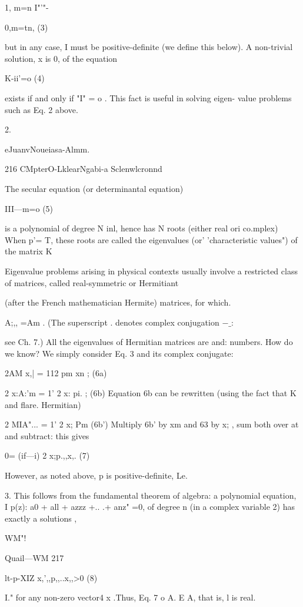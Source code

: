 1, m=n
I"'"-{0,m=tn, (3)

but in any case, I must be positive-deﬁnite (we deﬁne this
below). A non-trivial solution, x is 0, of the equation

K-ii'=o (4)

exists if and only if "I" = o . This fact is useful in solving eigen-
value problems such as Eq. 2 above.

 

2.

eJuanvNoueiasa-Almm.

216 CMpterO-LklearNgabi-a Sclenwlcronnd

The secular equation (or determinantal equation)

III—m=o (5)

is a polynomial of degree N inl, hence has N roots (either real ori
co.mplex) When p'= T, these roots are called the eigenvalues
(or' 'characteristic values") of the matrix K

Eigenvalue problems arising in physical contexts usually involve
a restricted class of matrices, called real-symmetric or Hermitiant

(after the French mathematician Hermite) matrices, for which.

A;,, =Am . (The superscript . denotes complex conjugation $-\_:$

see Ch. 7.) All the eigenvalues of Hermitian matrices are and:
numbers. How do we know? We simply consider Eq. 3 and its
complex conjugate:

 

2AM x,| = 112 pm xn ; (6a)

2 x:A:'m = 1' 2 x: pi. ; (6b)
Equation 6b can be rewritten (using the fact that K and flare.
Hermitian)

2 MIA"... = 1' 2 x; Pm (6b')
Multiply 6b' by xm and 63 by x; , sum both over at and subtract:
this gives

0= (if—i) 2 x;p.,,x,. (7)

However, as noted above, p is positive-deﬁnite, Le.

 

3. This follows from the fundamental theorem of algebra: a polynomial equation, I
p(z): a0 + all + azzz +.. .+ anz" =0, of degree n (in a complex variable 2) has exactly a solutions ,

WM"!

Quail—WM 217

lt-p-XIZ x,',,p,,..x,,>0 (8)

I."
for any non-zero vector4 x .Thus, Eq. 7 o A. E A, that is, l is real.

}
